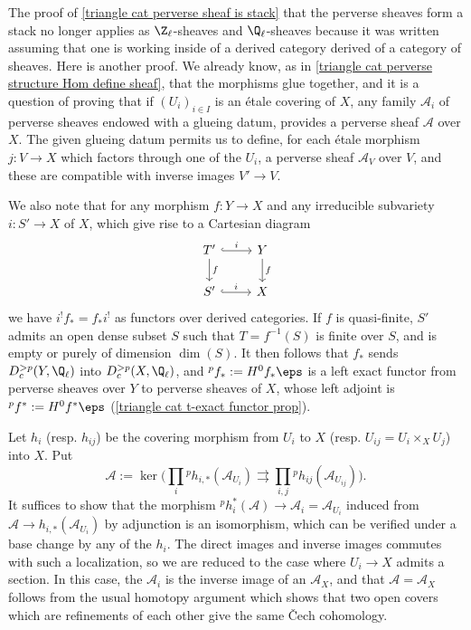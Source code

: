 The proof of \cref{triangle cat perverse sheaf is stack} that the perverse sheaves form a stack no longer applies as $\Z_\ell$-sheaves and $\Q_\ell$-sheaves because it was written assuming that one is working inside of a derived category derived of a category of sheaves. Here is another proof. We already know, as in \cref{triangle cat perverse structure Hom define sheaf}, that the morphisms glue together, and it is a question of proving that if $(U_i)_{i\in I}$ is an \'etale covering of $X$, any family $\mathscr{A}_i$ of perverse sheaves endowed with a glueing datum, provides a perverse sheaf $\mathscr{A}$ over $X$. The given glueing datum permits us to define, for each \'etale morphism $j:V\to X$ which factors through one of the $U_i$, a perverse sheaf $\mathscr{A}_V$ over $V$, and these are compatible with inverse images $V'\to V$.\par
We also note that for any morphism $f:Y\to X$ and any irreducible subvariety $i:S'\to X$ of $X$, which give rise to a Cartesian diagram
\[\begin{tikzcd}
T'\ar[r,hook,"i"]\ar[d,"f"]&Y\ar[d,"f"]\\
S'\ar[r,hook,"i"]&X
\end{tikzcd}\]
we have $i^!f_*=f_*i^!$ as functors over derived categories. If $f$ is quasi-finite, $S'$ admits an open dense subset $S$ such that $T=f^{-1}(S)$ is finite over $S$, and is empty or purely of dimension $\dim(S)$. It then follows that $f_*$ sends $D_c^{>p}(Y,\Q_\ell)$ into $D_c^{>p}(X,\Q_\ell)$, and ${^pf_*}:=H^0f_*\eps$ is a left exact functor from perverse sheaves over $Y$ to perverse sheaves of $X$, whose left adjoint is ${^pf^*}:=H^0f^*\eps$ (\cref{triangle cat t-exact functor prop}).\par
Let $h_i$ (resp. $h_{ij}$) be the covering morphism from $U_i$ to $X$ (resp. $U_{ij}=U_i\times_XU_j$) into $X$. Put
\[\mathscr{A}:=\ker\Big(\prod_i{^ph_{i,*}(\mathscr{A}_{U_i})}\rightrightarrows\prod_{i,j}{^ph_{ij}}(\mathscr{A}_{U_{ij}})\Big).\]
It suffices to show that the morphism ${^ph_i^*}(\mathscr{A})\to\mathscr{A}_i=\mathscr{A}_{U_i}$ induced from $\mathscr{A}\to h_{i,*}(\mathscr{A}_{U_i})$ by adjunction is an isomorphism, which can be verified under a base change by any of the $h_i$. The direct images and inverse images commutes with such a localization, so we are reduced to the case where $U_i\to X$ admits a section. In this case, the $\mathscr{A}_i$ is the inverse image of an $\mathscr{A}_X$, and that $\mathscr{A}=\mathscr{A}_X$ follows from the usual homotopy argument which shows that two open covers which are refinements of each other give the same \v{C}ech cohomology.